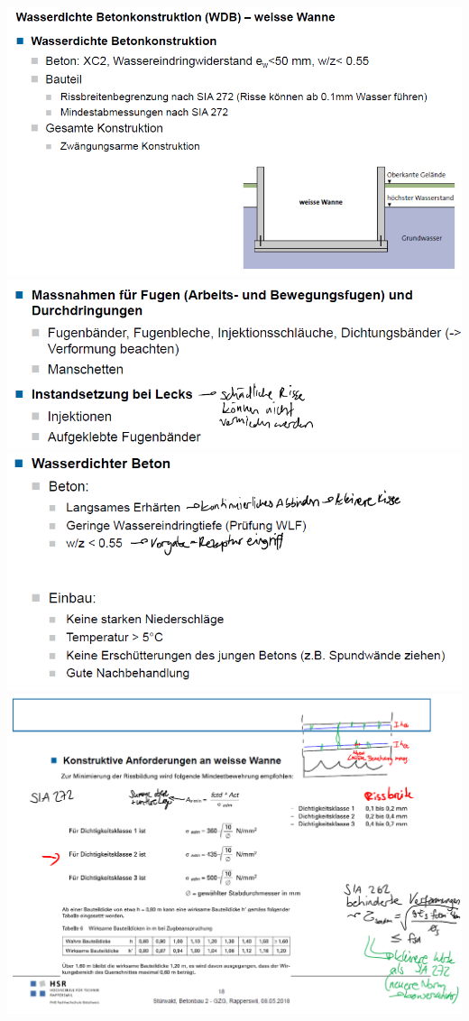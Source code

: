 \begin{multicols}{2}
				\includegraphics[width=\linewidth]{images/Dichtheit4WeisseWanne1.PNG}
				\includegraphics[width=\linewidth]{images/Dichtheit4WeisseWanne2.PNG}
				\includegraphics[width=\linewidth]{images/Dichtheit4WeisseWanne3.PNG}
				\includegraphics[width=\linewidth]{images/Dichtheit4WeisseWanne4.PNG}
				
	\end{multicols}
